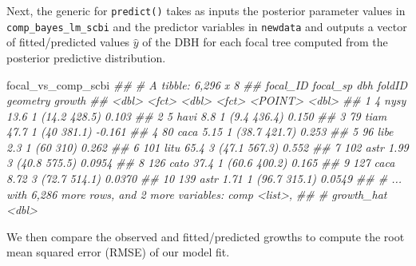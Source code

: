 \documentclass[12pt]{article}
\newenvironment{Shaded}{\begin{snugshade}}{\end{snugshade}}
\newcommand{\CommentTok}[1]{\textcolor[rgb]{0.56,0.35,0.01}{\textit{#1}}}
\newcommand{\DataTypeTok}[1]{\textcolor[rgb]{0.13,0.29,0.53}{#1}}
\newcommand{\KeywordTok}[1]{\textcolor[rgb]{0.13,0.29,0.53}{\textbf{#1}}}
\newcommand{\NormalTok}[1]{#1}
\newcommand{\OperatorTok}[1]{\textcolor[rgb]{0.81,0.36,0.00}{\textbf{#1}}}
\newcommand{\StringTok}[1]{\textcolor[rgb]{0.31,0.60,0.02}{#1}}
\begin{document}
Next, the generic for \texttt{predict()} takes as inputs the posterior
parameter values in \texttt{comp\_bayes\_lm\_scbi} and the predictor
variables in \texttt{newdata} and outputs a vector of fitted/predicted
values \(\widehat{y}\) of the DBH for each focal tree computed from the
posterior predictive distribution.

\begin{Shaded}
\end{Shaded}

\begin{Shaded}
\begin{Highlighting}[]
\NormalTok{focal_vs_comp_scbi}
\CommentTok{## # A tibble: 6,296 x 8}
\CommentTok{##    focal_ID focal_sp   dbh foldID                  geometry  growth}
\CommentTok{##       <dbl> <fct>    <dbl> <fct>                    <POINT>   <dbl>}
\CommentTok{##  1        4 nysy     13.6  1                   (14.2 428.5)  0.103 }
\CommentTok{##  2        5 havi      8.8  1                    (9.4 436.4)  0.150 }
\CommentTok{##  3       79 tiam     47.7  1                     (40 381.1) -0.161 }
\CommentTok{##  4       80 caca      5.15 1                   (38.7 421.7)  0.253 }
\CommentTok{##  5       96 libe      2.3  1                       (60 310)  0.262 }
\CommentTok{##  6      101 litu     65.4  3                   (47.1 567.3)  0.552 }
\CommentTok{##  7      102 astr      1.99 3                   (40.8 575.5)  0.0954}
\CommentTok{##  8      126 cato     37.4  1                   (60.6 400.2)  0.165 }
\CommentTok{##  9      127 caca      8.72 3                   (72.7 514.1)  0.0370}
\CommentTok{## 10      139 astr      1.71 1                   (96.7 315.1)  0.0549}
\CommentTok{## # ... with 6,286 more rows, and 2 more variables: comp <list>,}
\CommentTok{## #   growth_hat <dbl>}
\end{Highlighting}
\end{Shaded}

We then compare the observed and fitted/predicted growths to compute the
root mean squared error (RMSE) of our model fit.

\begin{Shaded}
\end{Shaded}
\end{document}
